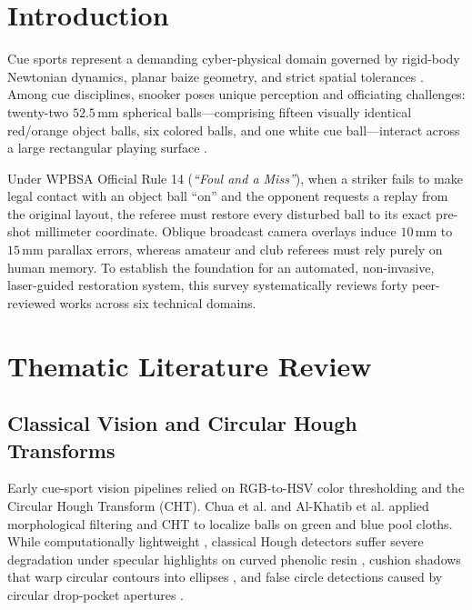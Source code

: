 \documentclass[conference]{IEEEtran}
\begin{document}
\section{Introduction}
Cue sports represent a demanding cyber-physical domain governed by rigid-body Newtonian dynamics, planar baize geometry, and strict spatial tolerances \cite{ref15, ref16, ref27}. Among cue disciplines, snooker poses unique perception and officiating challenges: twenty-two $52.5\,\text{mm}$ spherical balls---comprising fifteen visually identical red/orange object balls, six colored balls, and one white cue ball---interact across a large rectangular playing surface \cite{ref4, ref12}.

Under WPBSA Official Rule 14 (\textit{``Foul and a Miss''}), when a striker fails to make legal contact with an object ball ``on'' and the opponent requests a replay from the original layout, the referee must restore every disturbed ball to its exact pre-shot millimeter coordinate. Oblique broadcast camera overlays induce $10\,\text{mm}$ to $15\,\text{mm}$ parallax errors, whereas amateur and club referees must rely purely on human memory. To establish the foundation for an automated, non-invasive, laser-guided restoration system, this survey systematically reviews forty peer-reviewed works across six technical domains.

\section{Thematic Literature Review}

\subsection{Classical Vision and Circular Hough Transforms}
Early cue-sport vision pipelines relied on RGB-to-HSV color thresholding and the Circular Hough Transform (CHT). Chua et al. \cite{ref4} and Al-Khatib et al. \cite{ref5} applied morphological filtering and CHT to localize balls on green and blue pool cloths. While computationally lightweight \cite{ref28}, classical Hough detectors suffer severe degradation under specular highlights on curved phenolic resin \cite{ref2, ref10}, cushion shadows that warp circular contours into ellipses \cite{ref7, ref8}, and false circle detections caused by circular drop-pocket apertures \cite{ref13}.
\end{document}
